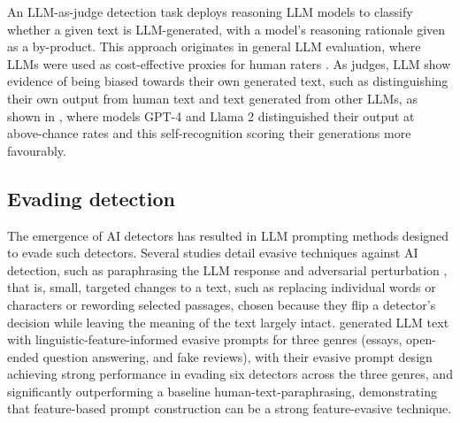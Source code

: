 \documentclass[thesis]{cluu}
\begin{document}
An LLM-as-judge detection task deploys reasoning LLM models to classify whether a given text is LLM-generated, with a model's reasoning rationale given as a by-product. This approach originates in general LLM evaluation, where LLMs were used as cost-effective proxies for human raters \textcite{zheng2023judging}. As judges, LLM show evidence of being biased towards their own generated text, such as distinguishing their own output from human text and text generated from other LLMs, as shown in \textcite{panickssery2024llmevaluators}, where models GPT-4 and Llama 2 distinguished their output at above-chance rates and this self-recognition scoring their generations more favourably.

\subsection{Evading detection}

 The emergence of AI detectors has resulted in LLM prompting methods designed to evade such detectors. Several studies detail evasive techniques against AI detection, such as paraphrasing the LLM response \parencite{sadasivan2025aigeneratedtextreliablydetected, krishna2023paraphrasing, huang-etal-2025-tempparaphraser} and adversarial perturbation \parencite{zhou2024humanizing, cheng2025adversarialparaphrasinguniversalattack}, that is, small, targeted changes to a text, such as replacing individual words or characters or rewording selected passages, chosen because they flip a detector's decision while leaving the meaning of the text largely intact. \textcite{lu2024sico} generated LLM text with linguistic-feature-informed evasive prompts for three genres (essays, open-ended question answering, and fake reviews), with their evasive prompt design achieving strong performance in evading six detectors across the three genres, and significantly outperforming a baseline human-text-paraphrasing, demonstrating that feature-based prompt construction can be a strong feature-evasive technique.
\end{document}
